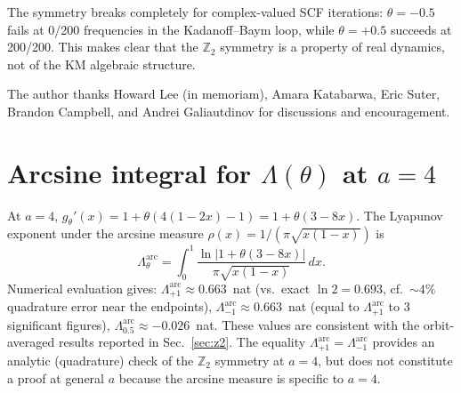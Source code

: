 \documentclass[aps,pre,twocolumn,superscriptaddress,nofootinbib,
               longbibliography,floatfix]{revtex4-2}
\newcommand{\Lam}{\Lambda}
\theoremstyle{plain}
\theoremstyle{remark}
\begin{document}
The symmetry breaks completely for complex-valued SCF
iterations: $\theta = -0.5$ fails at 0/200 frequencies in the
Kadanoff--Baym loop, while $\theta = +0.5$ succeeds at 200/200.
This makes clear that the $\mathbb{Z}_2$ symmetry is a
property of real dynamics, not of the KM algebraic structure.

\begin{acknowledgments}
The author thanks Howard Lee (in memoriam), Amara Katabarwa,
Eric Suter, Brandon Campbell, and Andrei Galiautdinov for
discussions and encouragement.
\end{acknowledgments}

\appendix

\section{Arcsine integral for $\Lam(\theta)$ at $a = 4$}
\label{app:arcsine}

At $a = 4$, $g_\theta'(x) = 1 + \theta(4(1-2x) - 1) = 1 + \theta(3 - 8x)$.
The Lyapunov exponent under the arcsine measure $\rho(x) = 1/(\pi\sqrt{x(1-x)})$ is
%
\begin{equation}
  \Lam_\theta^{\text{arc}}
  = \int_0^1
    \frac{\ln|1 + \theta(3 - 8x)|}{\pi\sqrt{x(1-x)}}\,dx.
  \label{eq:arc-integral}
\end{equation}
%
Numerical evaluation gives:
$\Lam_{+1}^{\text{arc}} \approx 0.663$~nat (vs.\ exact $\ln 2 = 0.693$,
cf.\ $\sim 4\%$ quadrature error near the endpoints),
$\Lam_{-1}^{\text{arc}} \approx 0.663$~nat (equal to $\Lam_{+1}^{\text{arc}}$
to 3 significant figures),
$\Lam_{0.5}^{\text{arc}} \approx -0.026$~nat.
These values are consistent with the orbit-averaged results
reported in Sec.~\ref{sec:z2}.
The equality $\Lam_{+1}^{\text{arc}} = \Lam_{-1}^{\text{arc}}$
provides an analytic (quadrature) check of the $\mathbb{Z}_2$
symmetry at $a = 4$, but does not constitute a proof at
general $a$ because the arcsine measure is specific to $a = 4$.


\end{document}
